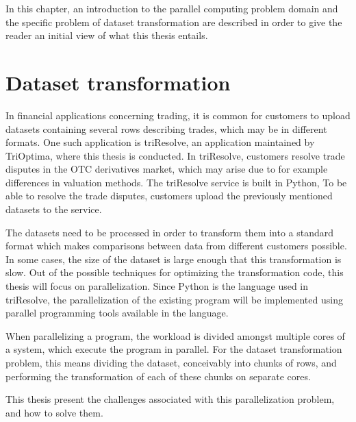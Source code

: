 In this chapter, an introduction to the parallel computing problem domain and the specific problem of dataset transformation are
described in order to give the reader an initial view of what this thesis entails.

\section{Dataset transformation} \label{dataset_standardization}
In financial applications concerning trading, it is common for customers to upload datasets containing several rows describing trades, which may be in different formats.
One such application is triResolve, an application maintained by TriOptima, where this thesis is conducted.  In triResolve, customers resolve trade disputes in the
OTC derivatives market, which may arise due to for example differences in valuation methods. The triResolve service is built in Python, To be able to resolve
the trade disputes, customers upload the previously mentioned datasets to the service.

The datasets need to be processed in order to transform them into a standard format which makes comparisons between data from different customers possible.
In some cases, the size of the dataset is large enough that this transformation is slow. Out of the possible techniques for optimizing the transformation code,
this thesis will focus on parallelization. Since Python is the language used in triResolve, the parallelization of the existing program will be implemented using
parallel programming tools available in the language. 

When parallelizing a program, the workload is divided amongst multiple cores of a system, which execute the program in parallel.
For the dataset transformation problem, this means dividing the dataset, conceivably into chunks of rows, and performing the transformation of each of these chunks
on separate cores.

This thesis present the challenges associated with this parallelization problem, and how to solve them.


